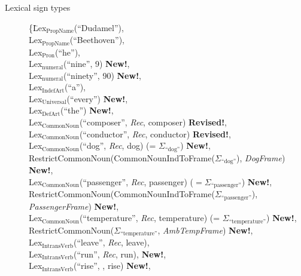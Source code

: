 \begin{description}



\item[Lexical sign types] \mbox{}

\begin{tabbing}
    \{\=Lex$_{\mathrm{PropName}}$(``Dudamel''), \\
    \> Lex$_{\mathrm{PropName}}$(``Beethoven''), \\
    \> Lex$_{\mathrm{Pron}}$(``he''), \\
    \> Lex$_{\mathrm{numeral}}$(``nine'', 9) \textbf{New!}, \\
    \> Lex$_{\mathrm{numeral}}$(``ninety'', 90) \textbf{New!}, \\ 
    \> Lex$_{\mathrm{IndefArt}}$(``a''), \\
    \> Lex$_{\mathrm{Universal}}$(``every'') \textbf{New!}, \\
\> Lex$_{\mathrm{DefArt}}$(``the'') \textbf{New!},\\
\> Lex$_{\text{CommonNoun}}$(``composer'', \textit{Rec}, composer) \textbf{Revised!},\\
\> Lex$_{\text{CommonNoun}}$(``conductor'', \textit{Rec}, conductor) \textbf{Revised!}, \\
\> Lex$_{\text{CommonNoun}}$(``dog'', \textit{Rec}, dog) (= $\Sigma_{\text{``dog''}}$)
\textbf{New!}, \\
\> RestrictCommonNoun(CommonNounIndToFrame($\Sigma_{\text{``dog''}}$),
\textit{DogFrame}) \textbf{New!},\\
\> Lex$_{\mathrm{CommonNoun}}$(``passenger'', \textit{Rec}, passenger) ($=\Sigma_{\text{``passenger''}}$)
\textbf{New!}, \\
\> RestrictCommonNoun(CommonNounIndToFrame($\Sigma_{\text{``passenger''}}$),
\textit{PassengerFrame}) \textbf{New!}, \\
\> Lex$_{\text{CommonNoun}}$(``temperature'', \textit{Rec},
temperature) (= $\Sigma_{\text{``temperature''}}$) \textbf{New!}, \\
\> RestrictCommonNoun($\Sigma_{\text{``temperature''}}$,
\textit{AmbTempFrame}) \textbf{New!},\\
\> Lex$_{\mathrm{IntransVerb}}$(``leave'', \textit{Rec}, leave), \\
\> Lex$_{\mathrm{IntransVerb}}$(``run'', \textit{Rec}, run),
\textbf{New!}, \\
\> Lex$_{\mathrm{IntransVerb}}$(``rise'', ,
rise) \textbf{New!}, \\

\end{tabbing}
\end{description}
